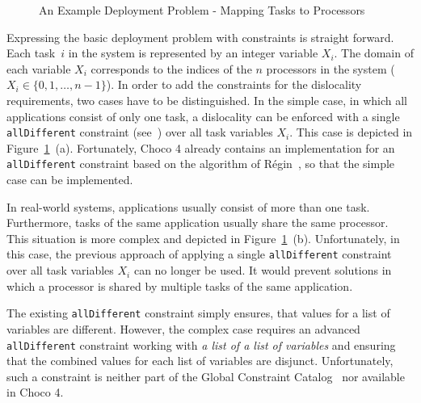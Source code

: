 \documentclass[conference]{IEEEtran}
\begin{document}
\begin{figure}
  \hfill
  \caption{An Example Deployment Problem - Mapping Tasks to Processors}
  \label{example}
\end{figure}

Expressing the basic deployment problem with constraints is straight forward.
Each task~$i$ in the system is represented by an integer variable $X_i$.
The domain of each variable $X_i$ corresponds to the indices of the $n$ processors in the system ($X_i  \in \{0, 1, \dots, n-1\}$).
In order to add the constraints for the dislocality requirements, two cases have to be distinguished. 
In the simple case, in which all applications consist of only one task, a dislocality can be enforced with a single \texttt{allDifferent} constraint (see~\cite{GCCAT2014}) over all task variables $X_i$.
This case is depicted in Figure~\ref{example}~(a).
Fortunately, Choco 4 already contains an implementation for an \texttt{allDifferent} constraint based on the algorithm of Régin~\cite{Regin1994}, so that the simple case can be implemented.

In real-world systems, applications usually consist of more than one task.
Furthermore, tasks of the same application usually share the same processor.
This situation is more complex and depicted in Figure~\ref{example}~(b).
Unfortunately, in this case, the previous approach of applying a single \texttt{allDifferent} constraint over all task variables $X_i$ can no longer be used.
It would prevent solutions in which a processor is shared by multiple tasks of the same application.

The existing \texttt{allDifferent} constraint simply ensures, that values for a list of variables are different.
However, the complex case requires an advanced \texttt{allDifferent} constraint working with \emph{a list of a list of variables} and ensuring that the combined values for each list of variables are disjunct.
Unfortunately, such a constraint is neither part of the Global Constraint Catalog~\cite{GCCAT2014} nor available in Choco 4.
\end{document}
